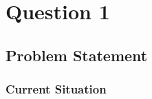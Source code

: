 \documentclass[a4paper]{article}
\begin{document}

\tableofcontents

\section{Question 1}
\subsection{Problem Statement}
\subsubsection{Current Situation}





\end{document}
